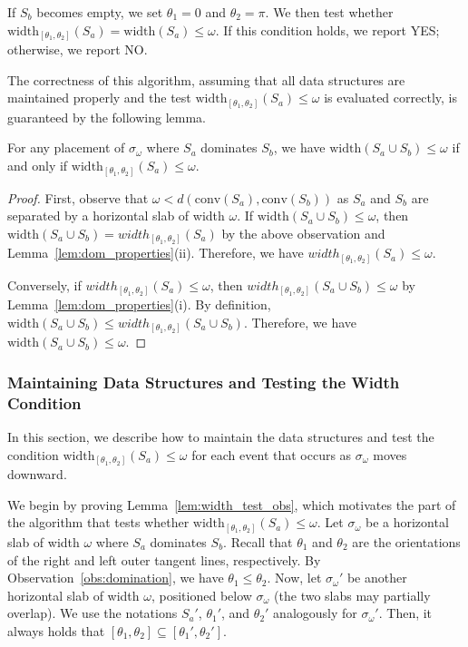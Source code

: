 \documentclass[english,a4paper, cleveref, autoref, thm-restate, nolineno]{socg-lipics-v2021}
\theoremstyle{star}
\theoremstyle{claimstar}
\newcommand{\width}{\ensuremath{\mathrm{width}}}
\newcommand{\conv}{\ensuremath{\mathrm{conv}}}
\begin{document}
If $S_b$ becomes empty, we set $\theta_1 = 0$ and $\theta_2 = \pi$. 
We then test whether $\width_{[\theta_1, \theta_2]}(S_a) = \width(S_a) \le \omega$. 
If this condition holds, we report YES; otherwise, we report NO.


The correctness of this algorithm, assuming that all data structures are maintained properly and the test $\width_{[\theta_1, \theta_2]}(S_a) \le \omega$ is evaluated correctly, is guaranteed by the following lemma.


\begin{lemma}
    \label{lem:decision_correctness}
    For any placement of $\sigma_\omega$ where $S_a$ dominates $S_b$, we have $\width(S_a \cup S_b) \le \omega$ if and only if $\width_{[\theta_1, \theta_2]}(S_a) \le \omega$. 
\end{lemma}

\begin{proof}
    First, observe that $\omega < d(\conv(S_a), \conv(S_b)) $ 
    as $S_a$ and $S_b$ are separated by a horizontal slab of width $\omega$.
    If $\width(S_a \cup S_b) \le \omega$, then $\width(S_a\cup S_b) =width_{[\theta_1, \theta_2]}(S_a)$ by the above observation and Lemma~\ref{lem:dom_properties}(ii).
    Therefore, we have $width_{[\theta_1, \theta_2]}(S_a) \le \omega$. 

    Conversely, if $width_{[\theta_1, \theta_2]}(S_a) \le \omega$, then $width_{[\theta_1, \theta_2]}(S_a \cup S_b) \le \omega$ by Lemma~\ref{lem:dom_properties}(i).
    By definition, $\width(S_a \cup S_b) \le width_{[\theta_1, \theta_2]}(S_a \cup S_b)$.
    Therefore, we have $\width(S_a \cup S_b) \le \omega$.
\end{proof}




\subsubsection{Maintaining Data Structures and Testing the Width Condition}
\label{sec:ds_maintain}


In this section, we describe how to maintain the data structures and test the condition $\width_{[\theta_1, \theta_2]}(S_a) \le \omega$ for each event that occurs as $\sigma_\omega$ moves downward.

We begin by proving Lemma~\ref{lem:width_test_obs}, which motivates the part of the algorithm that tests whether $\width_{[\theta_1, \theta_2]}(S_a) \le \omega$.
Let $\sigma_\omega$ be a horizontal slab of width $\omega$ where $S_a$ dominates $S_b$.
Recall that $\theta_1$ and $\theta_2$ are the orientations of the right and left outer tangent lines, respectively.
By Observation~\ref{obs:domination}, we have $\theta_1 \le \theta_2$.
Now, let $\sigma_\omega'$ be another horizontal slab of width $\omega$, positioned below $\sigma_\omega$ (the two slabs may partially overlap).
We use the notations $S_a'$, $\theta_1'$, and $\theta_2'$ analogously for $\sigma_{\omega}'$.
Then, it always holds that $[\theta_1, \theta_2] \subseteq[\theta_1', \theta_2']$.
\end{document}
